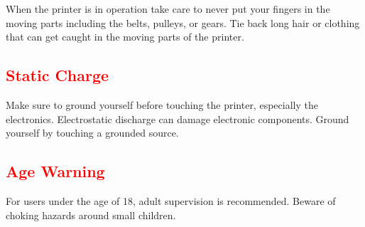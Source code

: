 When the printer is in operation take care to never put your fingers in the moving parts including the belts, pulleys, or gears. Tie back long hair or clothing that can get caught in the moving parts of the printer.

\subsection{\textcolor{red}{Static Charge}}
Make sure to ground yourself before touching the printer, especially the electronics. Electrostatic discharge can damage electronic components. Ground yourself by touching a grounded source.

\subsection{\textcolor{red}{Age Warning}}

For users under the age of 18, adult supervision is recommended. Beware of choking hazards around small children.

